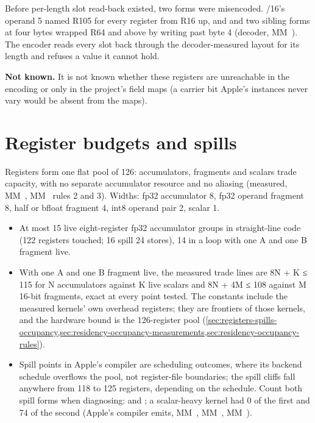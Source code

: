 Before per-length slot read-back existed, two forms were misencoded.
/16's operand 5 named R105 for every register from R16 up, and  and two sibling forms at four bytes wrapped R64 and above by writing past byte 4 (decoder, MM~). The
encoder reads every slot back through the decoder-measured layout for its length and refuses a value it cannot hold.

\textbf{Not known.} It is not known whether these registers are unreachable in the encoding or only in the project's field
maps (a carrier bit Apple's instances never vary would be absent from the maps).

\section{Register budgets and spills}\label{sec:capacity-budgets-spills}

Registers form one flat pool of 126: accumulators, fragments and scalars trade capacity, with no separate accumulator
resource and no aliasing (measured, MM~, MM~ rules 2 and 3). Widths: fp32 accumulator 8, fp32 operand
fragment 8, half or bfloat fragment 4, int8 operand pair 2, scalar 1.

\begin{itemize}
\item At most 15 live eight-register fp32 accumulator groups in straight-line code (122 registers touched; 16 spill 24
  stores), 14 in a loop with one A and one B fragment live.
\item With one A and one B fragment live, the measured trade lines are 8N + K ≤ 115 for N accumulators against K live
  scalars and 8N + 4M ≤ 108 against M 16-bit fragments, exact at every point tested. The constants include the
  measured kernels' own overhead registers; they are frontiers of those kernels, and the hardware bound is the 126-register
  pool (\cref{sec:registers-spills-occupancy,sec:residency-occupancy-measurements,sec:residency-occupancy-rules}).
\item Spill points in Apple's compiler are scheduling outcomes, where its backend schedule overflows the pool, not
  register-file boundaries; the spill cliffs fall anywhere from 118 to 125 registers, depending on the schedule. Count both spill forms when diagnosing:  and ; a scalar-heavy kernel had 0 of the first and
  74 of the second (Apple's compiler emits, MM~, MM~, MM~).
\end{itemize}

